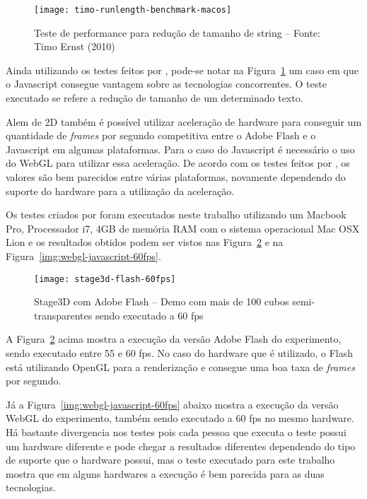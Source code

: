 \begin{figure}[H]
  \centering
	\texttt{[image: timo-runlength-benchmark-macos]}
  \caption{Teste de performance para redução de tamanho de string {--} Fonte: Timo Ernst (2010)}
  \label{img:timo-runlength-benchmark-macos}
\end{figure}

Ainda utilizando os testes feitos por ,
pode-se notar na Figura~\ref{img:timo-runlength-benchmark-macos} um
caso em que o Javascript consegue vantagem sobre as tecnologias
concorrentes. O teste executado se refere a redução de tamanho de um
determinado texto.

Alem de 2D também é possível utilizar aceleração de hardware para conseguir um quantidade
de \textit{frames} por segundo competitiva entre o Adobe Flash e o
Javascript em algumas plataformas. Para o caso do Javascript é necessário o uso do WebGL para
utilizar essa aceleração. De acordo com os testes feitos por
, os valores são bem parecidos entre várias
plataformas, novamente dependendo do suporte do hardware para a
utilização da aceleração.

Os testes criados por  foram executados
neste trabalho utilizando um Macbook Pro, Processador i7, 4GB de memória RAM com o sistema operacional
Mac OSX Lion e os resultados obtidos podem ser vistos nas Figura~\ref{img:stage3d-flash-60fps}
e na Figura~\ref{img:webgl-javascript-60fps}.

\begin{figure}[H]
  \centering
	\texttt{[image: stage3d-flash-60fps]}
  \caption{Stage3D com Adobe Flash {--} Demo com mais de 100 cubos
  semi-transparentes sendo executado a 60 fps}
  \label{img:stage3d-flash-60fps}
\end{figure}

A Figura~\ref{img:stage3d-flash-60fps} acima mostra a execução da
versão Adobe Flash do experimento, sendo executado entre 55 e 60 fps.
No caso do hardware que é utilizado, o Flash está utilizando OpenGL
para a renderização e consegue uma boa taxa de \textit{frames} por
segundo.

Já a Figura~\ref{img:webgl-javascript-60fps} abaixo mostra a execução da
versão WebGL do experimento, também sendo executado a 60 fps no mesmo
hardware. Há bastante divergencia nos testes pois cada pessoa que
executa o teste possui um hardware diferente e pode chegar a
resultados diferentes dependendo do tipo de suporte que o hardware
possui, mas o teste executado para este trabalho mostra que em alguns
hardwares a execução é bem parecida para as duas tecnologias.

